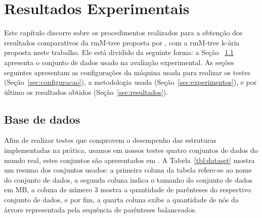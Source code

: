 \chapter{Resultados Experimentais}\label{chp:resultados}

Este capítulo discorre sobre os procedimentos realizados para a obtenção dos resultados comparativos da rmM-tree proposta por \citet{paper-fully-functinal-succint-trees},
com a rmM-tree k-ária proposta neste trabalho. Ele está dividido da seguinte forma: a Seção ~\ref{sec:base-de-dados} apresenta o conjunto de dados usado na avaliação experimental.
As seções seguintes apresentam as configurações da máquina usada para realizar os testes (Seção~\ref{sec:configuracao}), a metodologia usada (Seção~\ref{sec:experimentos}), e por último os resultados obtidos (Seção~\ref{sec:resultados}).


\section{Base de dados}\label{sec:base-de-dados}
Afim de realizar testes que comprovem o desempenho das estruturas implementadas na prática, usamos em nossos testes quatro conjuntos de dados do mundo real, estes conjuntos são apresentados em \citet{datasets-inf-udec}.
A Tabela~\ref{tbl:dataset} mostra um resumo dos conjuntos usados: a primeira coluna da tabela refere-se ao nome do conjunto de dados, a segunda coluna indica o tamanho do conjunto de dados em MB, a coluna de número 3 mostra a quantidade de parênteses do respectivo conjunto de dados, e por fim, a quarta coluna exibe a quantidade de nós da árvore representada pela sequência de parênteses balanceados.


